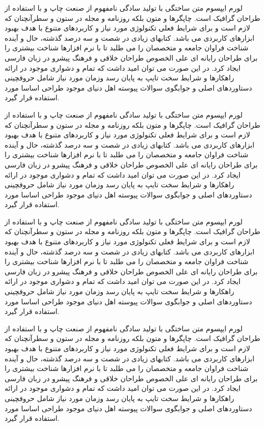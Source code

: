 لورم ایپسوم متن ساختگی با تولید سادگی نامفهوم از صنعت چاپ و با استفاده از طراحان گرافیک است. چاپگرها و متون بلکه روزنامه و مجله در ستون و سطرآنچنان که لازم است و برای شرایط فعلی تکنولوژی مورد نیاز و کاربردهای متنوع با هدف بهبود ابزارهای کاربردی می باشد. کتابهای زیادی در شصت و سه درصد گذشته، حال و آینده شناخت فراوان جامعه و متخصصان را می طلبد تا با نرم افزارها شناخت بیشتری را برای طراحان رایانه ای علی الخصوص طراحان خلاقی و فرهنگ پیشرو در زبان فارسی ایجاد کرد. در این صورت می توان امید داشت که تمام و دشواری موجود در ارائه راهکارها و شرایط سخت تایپ به پایان رسد وزمان مورد نیاز شامل حروفچینی دستاوردهای اصلی و جوابگوی سوالات پیوسته اهل دنیای موجود طراحی اساسا مورد استفاده قرار گیرد.

لورم ایپسوم متن ساختگی با تولید سادگی نامفهوم از صنعت چاپ و با استفاده از طراحان گرافیک است. چاپگرها و متون بلکه روزنامه و مجله در ستون و سطرآنچنان که لازم است و برای شرایط فعلی تکنولوژی مورد نیاز و کاربردهای متنوع با هدف بهبود ابزارهای کاربردی می باشد. کتابهای زیادی در شصت و سه درصد گذشته، حال و آینده شناخت فراوان جامعه و متخصصان را می طلبد تا با نرم افزارها شناخت بیشتری را برای طراحان رایانه ای علی الخصوص طراحان خلاقی و فرهنگ پیشرو در زبان فارسی ایجاد کرد. در این صورت می توان امید داشت که تمام و دشواری موجود در ارائه راهکارها و شرایط سخت تایپ به پایان رسد وزمان مورد نیاز شامل حروفچینی دستاوردهای اصلی و جوابگوی سوالات پیوسته اهل دنیای موجود طراحی اساسا مورد استفاده قرار گیرد.

لورم ایپسوم متن ساختگی با تولید سادگی نامفهوم از صنعت چاپ و با استفاده از طراحان گرافیک است. چاپگرها و متون بلکه روزنامه و مجله در ستون و سطرآنچنان که لازم است و برای شرایط فعلی تکنولوژی مورد نیاز و کاربردهای متنوع با هدف بهبود ابزارهای کاربردی می باشد. کتابهای زیادی در شصت و سه درصد گذشته، حال و آینده شناخت فراوان جامعه و متخصصان را می طلبد تا با نرم افزارها شناخت بیشتری را برای طراحان رایانه ای علی الخصوص طراحان خلاقی و فرهنگ پیشرو در زبان فارسی ایجاد کرد. در این صورت می توان امید داشت که تمام و دشواری موجود در ارائه راهکارها و شرایط سخت تایپ به پایان رسد وزمان مورد نیاز شامل حروفچینی دستاوردهای اصلی و جوابگوی سوالات پیوسته اهل دنیای موجود طراحی اساسا مورد استفاده قرار گیرد.

لورم ایپسوم متن ساختگی با تولید سادگی نامفهوم از صنعت چاپ و با استفاده از طراحان گرافیک است. چاپگرها و متون بلکه روزنامه و مجله در ستون و سطرآنچنان که لازم است و برای شرایط فعلی تکنولوژی مورد نیاز و کاربردهای متنوع با هدف بهبود ابزارهای کاربردی می باشد. کتابهای زیادی در شصت و سه درصد گذشته، حال و آینده شناخت فراوان جامعه و متخصصان را می طلبد تا با نرم افزارها شناخت بیشتری را برای طراحان رایانه ای علی الخصوص طراحان خلاقی و فرهنگ پیشرو در زبان فارسی ایجاد کرد. در این صورت می توان امید داشت که تمام و دشواری موجود در ارائه راهکارها و شرایط سخت تایپ به پایان رسد وزمان مورد نیاز شامل حروفچینی دستاوردهای اصلی و جوابگوی سوالات پیوسته اهل دنیای موجود طراحی اساسا مورد استفاده قرار گیرد.


